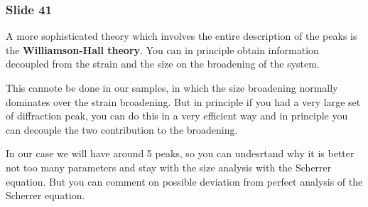 \documentclass[../main/main.tex]{subfiles}
\begin{document}
\subsubsection{Slide 41}
A more sophisticated theory which involves the entire description of the peaks is the \textbf{Williamson-Hall theory}. You can in principle obtain information decoupled from the strain and the size on the broadening of the system.

This cannote be done in our samples, in which the size broadening normally dominates over the strain broadening. But in principle if you had a very large set of diffraction peak, you can do this in a very efficient way and in principle you can decouple the two contribution to the broadening.

In our case we will have around 5 peaks, so you can undesrtand why it is better not too many parameters and stay with the size analysis with the Scherrer equation. But you can comment on possible deviation from perfect analysis of the Scherrer equation.



%
%
%
%
%
%
%
%
\end{document}

